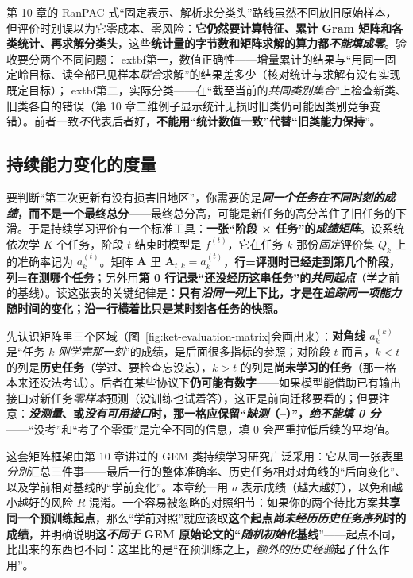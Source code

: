 第 10 章的 RanPAC 式“固定表示、解析求分类头”路线虽然不回放旧原始样本，但评价时别误以为它零成本、零风险：\textbf{它仍然要计算特征、累计 Gram 矩阵和各类统计、再求解分类头}，这些\textbf{统计量的字节数和矩阵求解的算力都\emph{不能填成零}}。验收要分两个不同问题：	extbf{第一，数值正确性}——增量累计的结果与“用同一固定岭目标、读全部已见样本\emph{联合}求解”的结果差多少（核对统计与求解有没有实现既定目标）；	extbf{第二，实际分类}——在“截至当前的\emph{共同类别集合}”上检查新类、旧类各自的错误（第 10 章二维例子显示统计无损时旧类仍可能因类别竞争变错）。前者一致\emph{不}代表后者好，\textbf{不能用“统计数值一致”代替“旧类能力保持}”。

\subsection{持续能力变化的度量}
\label{sec:ket-evaluation-continuous}

要判断“第三次更新有没有损害旧地区”，你需要的是\textbf{\emph{同一个任务在\emph{不同时刻}的成绩}，而不是一个最终总分}——最终总分高，可能是新任务的高分盖住了旧任务的下滑。于是持续学习评价有一个标准工具：\textbf{一张“阶段 × 任务”的\emph{成绩矩阵}}。设系统依次学 $K$ 个任务，阶段 $t$ 结束时模型是 $f^{(t)}$，它在任务 $k$ 那份\emph{固定}评价集 $Q_k$ 上的准确率记为 $a_k^{(t)}$。矩阵 $\bm A$ 里 $\bm A_{t,k}=a_k^{(t)}$，\textbf{行=评测时已经走到第几个阶段，列=在测哪个任务}；另外用\textbf{第 0 行记录“还没经历这串任务”的\emph{共同起点}}（学之前的基线）。读这张表的关键纪律是：\textbf{\textbf{只有\emph{沿同一列}上下比，才是在\emph{追踪同一项能力}随时间的变化}；沿一行横着比只是某时刻各任务的快照。}

先认识矩阵里三个区域（图~\ref{fig:ket-evaluation-matrix}会画出来）：\textbf{对角线 $a_k^{(k)}$}是“任务 $k$ \emph{刚学完那一刻}”的成绩，是后面很多指标的参照；对阶段 $t$ 而言，$k<t$ 的列是\textbf{历史任务}（学过、要检查忘没忘），$k>t$ 的列是\textbf{尚未学习的任务}（那一格本来还没法考试）。后者在某些协议下\textbf{仍可能有数字}——如果模型能借助已有输出接口对新任务\emph{零样本}预测（没训练也试着答），这正是前向迁移要看的；但要注意：\textbf{\emph{没测量}、或\emph{没有可用接口}时，那一格应保留“\emph{缺测}（--）”，\emph{绝不能填 0 分}}——“没考”和“考了个零蛋”是完全不同的信息，填 0 会严重拉低后续的平均值。

这套矩阵框架由第 10 章讲过的 GEM 类持续学习研究广泛采用：它从同一张表里\emph{分别}汇总三件事——最后一行的整体准确率、历史任务相对对角线的“后向变化”、以及学前相对基线的“学前变化”。本章统一用 $a$ 表示成绩（越大越好），以免和越小越好的风险 $R$ 混淆。一个容易被忽略的对照细节：如果你的两个待比方案\textbf{共享同一个预训练起点}，那么“学前对照”就应该取\textbf{这个起点\emph{尚未经历历史任务序列}时的成绩}，并明确说明\textbf{这\emph{不同于} GEM 原始论文的“\emph{随机初始化}基线}”——起点不同，比出来的东西也不同：这里比的是“在预训练之上，\emph{额外的历史经验}起了什么作用”。

